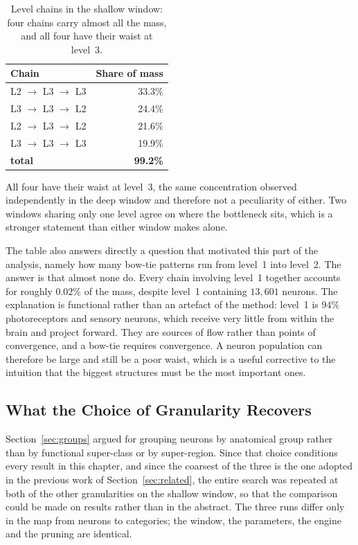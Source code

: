 \documentclass[12pt,a4paper,oneside]{article}
\theoremstyle{definition}
\theoremstyle{plain}
\begin{document}
\begin{table}[H]
\centering
\caption{Level chains in the shallow window: four chains carry almost all
the mass, and all four have their waist at level~3.}
\label{tab:chains-shallow}
\begin{tabular}{lr}
\toprule
Chain & Share of mass \\
\midrule
L2 $\to$ L3 $\to$ L3 & 33.3\% \\
L3 $\to$ L3 $\to$ L2 & 24.4\% \\
L2 $\to$ L3 $\to$ L2 & 21.6\% \\
L3 $\to$ L3 $\to$ L3 & 19.9\% \\
\midrule
\textbf{total} & \textbf{99.2\%} \\
\bottomrule
\end{tabular}
\end{table}

All four have their waist at level~3, the same concentration observed
independently in the deep window and therefore not a peculiarity of either.
Two windows sharing only one level agree on where the bottleneck sits, which
is a stronger statement than either window makes alone.

The table also answers directly a question that motivated this part of the
analysis, namely how many bow-tie patterns run from level~1 into level~2.
The answer is that almost none do. Every chain involving level~1 together
accounts for roughly $0.02\%$ of the mass, despite level~1 containing
$13{,}601$ neurons. The explanation is functional rather than an artefact of
the method: level~1 is $94\%$ photoreceptors and sensory neurons, which
receive very little from within the brain and project forward. They are
sources of flow rather than points of convergence, and a bow-tie requires
convergence. A neuron population can therefore be large and still be a poor
waist, which is a useful corrective to the intuition that the biggest
structures must be the most important ones.

\subsection{What the Choice of Granularity Recovers}
\label{sec:results-granularity}

Section~\ref{sec:groups} argued for grouping neurons by anatomical group
rather than by functional super-class or by super-region. Since that choice
conditions every result in this chapter, and since the coarsest of the three
is the one adopted in the previous work of Section~\ref{sec:related}, the
entire search was repeated at both of the other granularities on the shallow
window, so that the comparison could be made on results rather than in the
abstract. The three runs differ only in the map from neurons to categories;
the window, the parameters, the engine and the pruning are identical.
\end{document}
